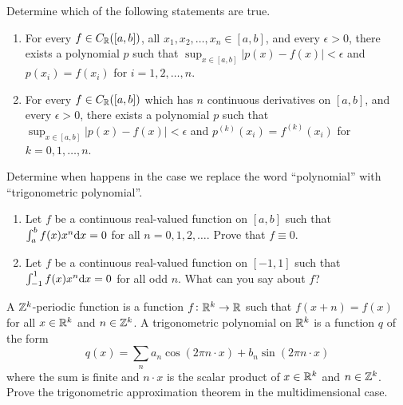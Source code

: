 \documentclass[11pt,a4paper]{article}
\begin{document}
\begin{exercise}
  Determine which of the following statements are true.
  \begin{enumerate}
  \item[(1)] For every $f \in C_{\mathbb{R}}([a, b])$,
    all $x_1, x_2, \dots, x_n \in [a,b]$,
    and every $\epsilon > 0$,
    there exists a polynomial $p$ such that
    $\sup_{x \in [a,b]} |p(x)-f(x)| < \epsilon$
    and $p(x_i) = f(x_i)$ for $i = 1,2,\dots,n$.
    \item[(2)] For every $f \in C_{\mathbb{R}}([a, b])$
    which has $n$ continuous derivatives on $[a,b]$,
    and every $\epsilon > 0$,
    there exists a polynomial $p$ such that
    $\sup_{x \in [a,b]} |p(x)-f(x)| < \epsilon$
    and $p^{(k)}(x_i) = f^{(k)}(x_i)$ for $k = 0,1,\dots,n$.
  \end{enumerate}
  Determine when happens in the case we replace the word ``polynomial'' with
  ``trigonometric polynomial''.
\end{exercise}
\begin{solution}

\end{solution}

\begin{exercise} \phantom{}
  \begin{enumerate}
    \item[(1)] Let $f$ be a continuous real-valued function on $[a,b]$
      such that $\int_{a}^{b} f(x) x^n \dx = 0$
      for all $n = 0,1,2,\dots$.
      Prove that $f \equiv 0$.
    \item[(2)] Let $f$ be a continuous real-valued function on $[-1,1]$
      such that $\int_{-1}^{1} f(x) x^n \dx = 0$
      for all odd $n$. What can you say about $f$?
  \end{enumerate}
\end{exercise}
\begin{solution}

\end{solution}

\begin{exercise}
  A $\mathbb{Z}^k$-periodic function is a function $f \colon \mathbb{R}^k \to \mathbb{R}$
  such that $f(x + n) = f(x)$ for all $x \in \mathbb{R}^k$ and $n \in \mathbb{Z}^k$.
  A trigonometric polynomial on $\mathbb{R}^k$ is a function $q$ of the form
  \[
    q(x) = \sum_{n} a_n \cos(2\pi n \cdot x) + b_n \sin(2\pi n \cdot x)
  \]
  where the sum is finite and $n \cdot x$ is the scalar product
  of $x \in \mathbb{R}^k$ and $n \in \mathbb{Z}^k$.
  Prove the trigonometric approximation theorem
  in the multidimensional case.
\end{exercise}
\begin{solution}

\end{solution}
\end{document}

